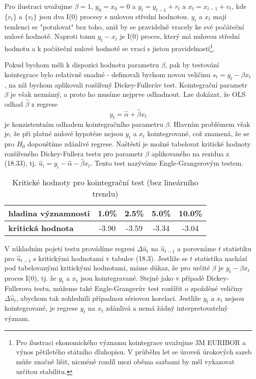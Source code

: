 Pro ilustraci uvažujme $\beta = 1$, $y_0 = x_0 = 0$ a $y_t = y_{t - 1} + r_t$ a $x_t = x_{t - 1} + v_t$, kde $\{r_t\}$ 
a $\{v_t\}$ jsou dva I(0) procesy s nulovou střední hodnotou. $y_t$ a $x_t$ mají tendenci se "potulovat" bez toho, 
aniž by se pravidelně vracely ke své počáteční nulové hodnotě. Naproti tomu $y_t - x_t$ je I(0) proces, který 
má nulovou střední hodnotu a k počáteční nulové hodnotě se vrací s jistou pravidelností\footnote{Pro ilustraci
ekonomického významu kointegrace uvažujme 3M EURIBOR a výnos pětiletého státního dluhopisu. V průběhu let se 
úroveň úrokových sazeb může značně lišit, nicméně rozdíl mezi oběma sazbami by měl vykazovat určitou stabilitu.}.

Pokud bychom měli k dispozici hodnotu parametru $\beta$, pak by testování kointegrace bylo relativně snadné - 
definovali bychom novou veličinu $s_t = y_t - \beta x_t$, na níž bychom aplikovali rozšířený Dickey-Fullerův 
test. Kointegrační parametr $\beta$ je však neznámý, a proto ho musíme nejprve odhadnout. Lze dokázat, že OLS 
odhad $\hat{\beta}$ z regrese
\begin{equation}
y_t = \hat{\alpha} + \hat{\beta} x_t
\end{equation}
je konzistentním odhadem kointegračního parametru $\beta$. Hlavním problémem však je, že při platné nulové hypotéze 
nejsou $y_t$ a $x_t$ kointegrované, což znamená, že se pro $H_0$ dopouštíme zdánlivé regrese. Naštěstí je 
možné tabelovat kritické hodnoty rozšířeného Dickey-Fullera testu pro parametr $\beta$ aplikovaného na rezidua 
z (18.33), tj. $\hat{u}_i = y_i - \hat{\alpha} - \hat{\beta} x_t$. Tento test nazýváme Engle-Grangerovým testem.

\begin{table}
\begin{center}
\begin{tabular}{| l | c | c | c | c |}
\hline
\bf{hladina významnosti} & 1.0\% & 2.5\% & 5.0\% & 10.0\%\\
\hline
\bf{kritická hodnota} & -3.90 & -3.59 & -3.34 & -3.04\\
\hline
\end{tabular}
\caption{Kritické hodnoty pro kointegrační test (bez lineárního trendu)}
\end{center}
\end{table}

V základním pojetí testu provádíme regresi $\Delta \hat{u}_t$ na $\hat{u}_{t - 1}$ a porovnáme $t$ statistiku pro 
$\hat{u}_{t - 1}$ s kritickými hodnotami v tabulce (18.3). Jestliže se $t$ statistika nachází pod tabelovanými 
kritickými hodnotami, máme důkaz, že pro určité $\beta$ je $y_t - \beta x_t$ proces I(0), tj. že $y_t$ a $x_t$ 
jsou kointegravané. Stejně jako v případě Dickey-Fullerova testu, můžeme také Engle-Grangerův test rozšířit 
o zpožděné veličiny $\Delta \hat{u}_t$, abychom tak zohlednili případnou sériovou korelaci. Jestliže $y_t$ a 
$x_t$ nejsou kointegrované, je regrese $y_t$ na $x_t$ zdánlivá a nemá žádný interpretovatelný význam.

